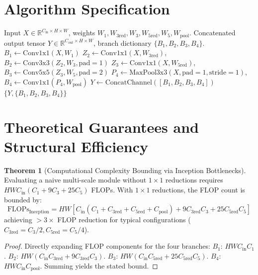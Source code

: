 \documentclass[11pt,a4paper]{article}
\theoremstyle{definition}
\newtheorem{theorem}{Theorem}[section]
\begin{document}
\section{Algorithm Specification}

\begin{algorithm}[H]
\caption{Inception Multi-Branch Module Forward Pass}
\label{alg:inception_block}
\begin{algorithmic}[1]
\Require Input $X \in \mathbb{R}^{C_{\text{in}} \times H \times W}$, weights $W_1, W_{3\text{red}}, W_3, W_{5\text{red}}, W_5, W_{\text{pool}}$.
\Ensure Concatenated output tensor $Y \in \mathbb{R}^{C_{\text{out}} \times H \times W}$, branch dictionary $\{B_1, B_2, B_3, B_4\}$.
\State $B_1 \gets \text{Conv1x1}(X, W_1)$
\State $Z_2 \gets \text{Conv1x1}(X, W_{3\text{red}})$, $B_2 \gets \text{Conv3x3}(Z_2, W_3, \text{pad}=1)$
\State $Z_3 \gets \text{Conv1x1}(X, W_{5\text{red}})$, $B_3 \gets \text{Conv5x5}(Z_3, W_5, \text{pad}=2)$
\State $P_4 \gets \text{MaxPool3x3}(X, \text{pad}=1, \text{stride}=1)$, $B_4 \gets \text{Conv1x1}(P_4, W_{\text{pool}})$
\State $Y \gets \text{ConcatChannel}([B_1, B_2, B_3, B_4])$
\State \Return $\{Y, \{B_1, B_2, B_3, B_4\}\}$
\end{algorithmic}
\end{algorithm}

\section{Theoretical Guarantees and Structural Efficiency}

\begin{theorem}[Computational Complexity Bounding via Inception Bottlenecks]
Evaluating a naive multi-scale module without $1 \times 1$ reductions requires $H W C_{\text{in}} (C_1 + 9 C_3 + 25 C_5)$ FLOPs. With $1 \times 1$ reductions, the FLOP count is bounded by:
\begin{equation}
\text{FLOPs}_{\text{Inception}} = H W \left[ C_{\text{in}}(C_1 + C_{3\text{red}} + C_{5\text{red}} + C_{\text{pool}}) + 9 C_{3\text{red}} C_3 + 25 C_{5\text{red}} C_5 \right]
\end{equation}
achieving $> 3\times$ FLOP reduction for typical configurations ($C_{3\text{red}} = C_3/2, C_{5\text{red}} = C_5/4$).
\end{theorem}

\begin{proof}
Directly expanding FLOP components for the four branches:
$B_1$: $H W C_{\text{in}} C_1$.
$B_2$: $H W (C_{\text{in}} C_{3\text{red}} + 9 C_{3\text{red}} C_3)$.
$B_3$: $H W (C_{\text{in}} C_{5\text{red}} + 25 C_{5\text{red}} C_5)$.
$B_4$: $H W C_{\text{in}} C_{\text{pool}}$.
Summing yields the stated bound.
\end{proof}
\end{document}
